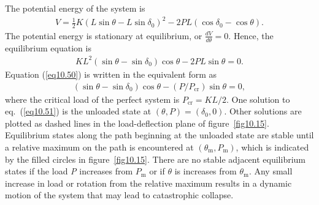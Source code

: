 \documentclass{AeroStructure-ERJohnson}
\begin{document}
{\def\floatbelowskip{-3pt}%
\def\thefigure{10.14}
}

\noindent The potential energy of the system is
\begin{align}\label{eq10.49}
V=\frac{1}{2} K\left(L \sin \theta-L \sin \delta_{0}\right)^{2}-2 P L\left(\cos \delta_{0}-\cos \theta\right).
\end{align}
The potential energy is stationary at equilibrium, or $\frac{d V}{d \theta}=0$. Hence, the equilibrium equation is
\begin{align}\label{eq10.50}
K L^{2}\left(\sin \theta-\sin \delta_{0}\right) \cos \theta-2 P L \sin \theta=0.
\end{align}
Equation (\ref{eq10.50}) is written in the equivalent form as
\begin{align}\label{eq10.51}
\left(\sin \theta-\sin \delta_{0}\right) \cos \theta-\left(P / P_{\mathrm{cr}}\right) \sin \theta=0,
\end{align}
where the critical load of the perfect system is $P_{\mathrm{cr}}=K L / 2$. One solution to eq.~(\ref{eq10.51}) is the unloaded state at $(\theta, P)=\left(\delta_{0}, 0\right)$. Other solutions are plotted as dashed lines in the load-deflection plane of figure~\ref{fig10.15}. Equilibrium states along the path beginning at the unloaded state are stable until a relative maximum on the path is encountered at $\left(\theta_{\mathrm{m}}, P_{\mathrm{m}}\right)$, which is indicated by the filled circles in figure~\ref{fig10.15}. There are no stable adjacent equilibrium states if the load \textit{P} increases from $P_{\mathrm{m}}$ or if $\theta$ is increases from $\theta_{\mathrm{m}}$. Any small increase in load or rotation from the relative maximum results in a dynamic motion of the system that may lead to catastrophic collapse.

{\def\thefigure{10.15}
}
\end{document}
